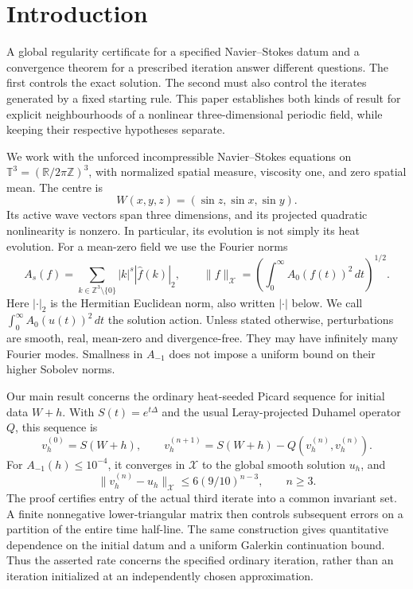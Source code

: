 \section{Introduction}

A global regularity certificate for a specified Navier--Stokes datum and a convergence theorem for a prescribed iteration answer different questions. The first controls the exact solution. The second must also control the iterates generated by a fixed starting rule. This paper establishes both kinds of result for explicit neighbourhoods of a nonlinear three-dimensional periodic field, while keeping their respective hypotheses separate.

We work with the unforced incompressible Navier--Stokes equations on
\(\mathbb T^3=(\mathbb R/2\pi\mathbb Z)^3\), with normalized spatial measure, viscosity one, and zero spatial mean. The centre is
\[
 W(x,y,z)=(\sin z,\sin x,\sin y).
\]
Its active wave vectors span three dimensions, and its projected quadratic nonlinearity is nonzero. In particular, its evolution is not simply its heat evolution. For a mean-zero field we use the Fourier norms
\[
 A_s(f)=\sum_{k\in\mathbb Z^3\setminus\{0\}}
       |k|^s|\widehat f(k)|_2,
 \qquad
 \|f\|_{\mathcal X}
   =\left(\int_0^\infty A_0(f(t))^2\,dt\right)^{1/2}.
\]
Here \(|\cdot|_2\) is the Hermitian Euclidean norm, also written \(|\cdot|\) below. We call \(\int_0^\infty A_0(u(t))^2\,dt\) the solution action. Unless stated otherwise, perturbations are smooth, real, mean-zero and divergence-free. They may have infinitely many Fourier modes. Smallness in \(A_{-1}\) does not impose a uniform bound on their higher Sobolev norms.

Our main result concerns the ordinary heat-seeded Picard sequence for initial data \(W+h\). With \(S(t)=e^{t\Delta}\) and the usual Leray-projected Duhamel operator \(Q\), this sequence is
\[
 v_h^{(0)}=S(W+h),\qquad
 v_h^{(n+1)}=S(W+h)-Q(v_h^{(n)},v_h^{(n)}).
\]
For \(A_{-1}(h)\le10^{-4}\), it converges in \(\mathcal X\) to the global smooth solution \(u_h\), and
\[
 \|v_h^{(n)}-u_h\|_{\mathcal X}
       \le 6(9/10)^{n-3},\qquad n\ge3.
\]
The proof certifies entry of the actual third iterate into a common invariant set. A finite nonnegative lower-triangular matrix then controls subsequent errors on a partition of the entire time half-line. The same construction gives quantitative dependence on the initial datum and a uniform Galerkin continuation bound. Thus the asserted rate concerns the specified ordinary iteration, rather than an iteration initialized at an independently chosen approximation.

